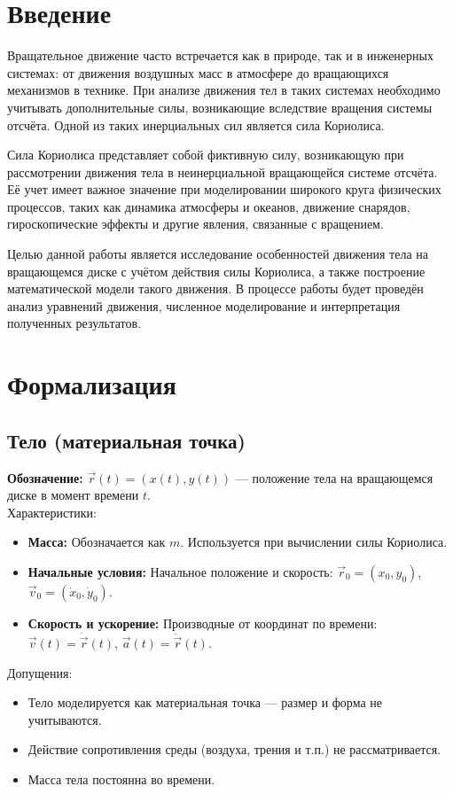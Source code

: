 \documentclass[a4paper,12pt]{article}
\begin{document}
\tableofcontents
\newpage

\section{Введение} 
Вращательное движение часто встречается как в природе, так и в инженерных системах: от движения воздушных масс в атмосфере до вращающихся механизмов в технике. При анализе движения тел в таких системах необходимо учитывать дополнительные силы, возникающие вследствие вращения системы отсчёта. Одной из таких инерциальных сил является сила Кориолиса.

Сила Кориолиса представляет собой фиктивную силу, возникающую при рассмотрении движения тела в неинерциальной вращающейся системе отсчёта. Её учет имеет важное значение при моделировании широкого круга физических процессов, таких как динамика атмосферы и океанов, движение снарядов, гироскопические эффекты и другие явления, связанные с вращением.

Целью данной работы является исследование особенностей движения тела на вращающемся диске с учётом действия силы Кориолиса, а также построение математической модели такого движения. В процессе работы будет проведён анализ уравнений движения, численное моделирование и интерпретация полученных результатов.

\newpage
\section{Формализация}

\subsection{Тело (материальная точка)}

\textbf{Обозначение:} $\vec{r}(t) = (x(t), y(t))$ — положение тела на вращающемся диске в момент времени $t$. \\
Характеристики:
\begin{itemize}
    \item \textbf{Масса:} Обозначается как $m$. Используется при вычислении силы Кориолиса.
    \item \textbf{Начальные условия:} Начальное положение и скорость: $\vec{r}_0 = (x_0, y_0)$, $\vec{v}_0 = (\dot{x}_0, \dot{y}_0)$.
    \item \textbf{Скорость и ускорение:} Производные от координат по времени: $\vec{v}(t) = \dot{\vec{r}}(t)$, $\vec{a}(t) = \ddot{\vec{r}}(t)$.
\end{itemize}
Допущения:
\begin{itemize}
    \item Тело моделируется как материальная точка — размер и форма не учитываются.
    \item Действие сопротивления среды (воздуха, трения и т.п.) не рассматривается.
    \item Масса тела постоянна во времени.
\end{itemize}
\end{document}
